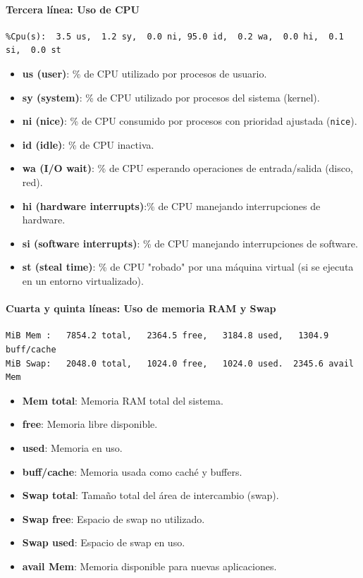 \paragraph{Tercera línea: Uso de CPU}
\begin{verbatim}
%Cpu(s):  3.5 us,  1.2 sy,  0.0 ni, 95.0 id,  0.2 wa,  0.0 hi,  0.1 si,  0.0 st
\end{verbatim}
\begin{itemize}
  \item \textbf{us (user)}: \% de CPU utilizado por procesos de usuario.
  \item \textbf{sy (system)}: \% de CPU utilizado por procesos del sistema (kernel).
  \item \textbf{ni (nice)}: \% de CPU consumido por procesos con prioridad ajustada (\texttt{nice}).
  \item \textbf{id (idle)}: \% de CPU inactiva.
  \item \textbf{wa (I/O wait)}: \% de CPU esperando operaciones de entrada/salida (disco, red).
  \item \textbf{hi (hardware interrupts)}:\% de CPU manejando interrupciones de hardware.
  \item \textbf{si (software interrupts)}: \% de CPU manejando interrupciones de software.
  \item \textbf{st (steal time)}: \% de CPU "robado" por una máquina virtual (si se ejecuta en un entorno virtualizado).
\end{itemize}

\paragraph{Cuarta y quinta líneas: Uso de memoria RAM y Swap}
\begin{verbatim}
MiB Mem :   7854.2 total,   2364.5 free,   3184.8 used,   1304.9 buff/cache
MiB Swap:   2048.0 total,   1024.0 free,   1024.0 used.  2345.6 avail Mem
\end{verbatim}
\begin{itemize}
  \item \textbf{Mem total}: Memoria RAM total del sistema.
  \item \textbf{free}: Memoria libre disponible.
  \item \textbf{used}: Memoria en uso.
  \item \textbf{buff/cache}: Memoria usada como caché y buffers.
  \item \textbf{Swap total}: Tamaño total del área de intercambio (swap).
  \item \textbf{Swap free}: Espacio de swap no utilizado.
  \item \textbf{Swap used}: Espacio de swap en uso.
  \item \textbf{avail Mem}: Memoria disponible para nuevas aplicaciones.
\end{itemize}

